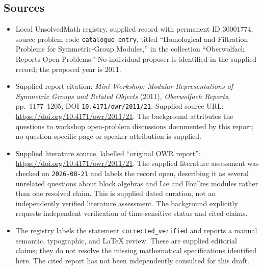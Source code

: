 \documentclass[11pt]{article}
\begin{document}
\subsection{Sources}
\begin{itemize}
\item Local UnsolvedMath registry, supplied record with permanent ID \(30001774\), source problem code \texttt{catalogue entry}, titled ``Homological and Filtration Problems for Symmetric-Group Modules,'' in the collection ``Oberwolfach Reports Open Problems.'' No individual proposer is identified in the supplied record; the proposed year is 2011.
\item Supplied report citation: \emph{Mini-Workshop: Modular Representations of Symmetric Groups and Related Objects} (2011), \emph{Oberwolfach Reports}, pp.\ 1177--1205, DOI \texttt{10.4171/owr/2011/21}. Supplied source URL: \url{https://doi.org/10.4171/owr/2011/21}. The background attributes the questions to workshop open-problem discussions documented by this report; no question-specific page or speaker attribution is supplied.
\item Supplied literature source, labelled ``original OWR report'': \url{https://doi.org/10.4171/owr/2011/21}. The supplied literature assessment was checked on \texttt{2026-08-21} and labels the record open, describing it as several unrelated questions about block algebras and Lie and Foulkes modules rather than one resolved claim. This is supplied dated curation, not an independently verified literature assessment. The background explicitly requests independent verification of time-sensitive status and cited claims.
\item The registry labels the statement \texttt{corrected\_verified} and reports a manual semantic, typographic, and LaTeX review. These are supplied editorial claims; they do not resolve the missing mathematical specifications identified here. The cited report has not been independently consulted for this draft.
\end{itemize}
\end{document}
